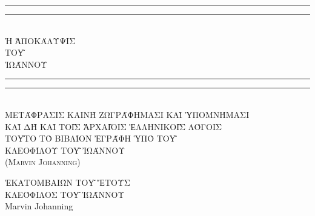 \begin{doubletitle}
    \textheight
    \centering
    \vspace*{\baselineskip}
    \rule{\textwidth}{1.6pt}\vspace*{-\baselineskip}\vspace*{2pt}
    \rule{\textwidth}{0.4pt}\\[\baselineskip]
    {\uppercase{\LARGE Ἡ Ἀποκάλυψις \\ τοῦ \\[0.3\baselineskip] Ἰωάννου }}\\[0.2\baselineskip]
    \rule{\textwidth}{0.4pt}\vspace*{-\baselineskip}\vspace{3.2pt}
    \rule{\textwidth}{1.6pt}\\[\baselineskip]
    \scshape
    \uppercase{Μετάφρασις καινὴ ζωγράφημασι καὶ ὑπομνήμασι \\
    καὶ δὴ καὶ τοῖς ἀρχαῖοις Ἑλληνικοῖς λόγοις} \\
    \vspace*{2\baselineskip}
    \uppercase{Τοῦτο τὸ βιβλίον ἐγράφη ὑπὸ τοῦ \\[\baselineskip]
    {\Large Κλεοφίλου τοῦ Ἰωάννου}} \\ (Marvin Johanning)\par
    \vfill
    {\scshape \uppercase{Ἑκατομβαιών τοῦ} } \uppercase{ἔτους}  \\
    {\large \uppercase{Κλεόφιλος τοῦ Ἰωάννου} \\ Marvin Johanning}\par
\end{doubletitle}